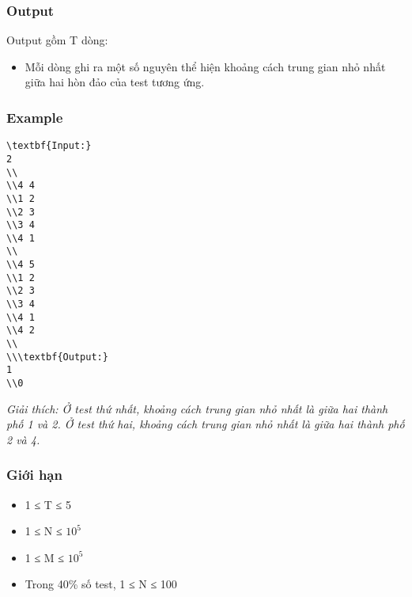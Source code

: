 \subsubsection{   Output  }

   Output gồm T dòng:  
\begin{itemize}
	\item     Mỗi dòng ghi ra một số nguyên thể hiện khoảng cách trung gian nhỏ nhất giữa hai hòn đảo của test tương ứng.   
\end{itemize}

\subsubsection{   Example  }
\begin{verbatim}
\textbf{Input:}
2
\\
\\4 4
\\1 2
\\2 3
\\3 4
\\4 1
\\
\\4 5 
\\1 2
\\2 3
\\3 4
\\4 1
\\4 2
\\
\\\textbf{Output:}
1
\\0\end{verbatim}

\emph{    Giải thích: Ở test thứ nhất, khoảng cách trung gian nhỏ nhất là giữa hai thành phố 1 và 2. Ở test thứ hai, khoảng cách trung gian nhỏ nhất là giữa hai thành phố 2 và 4.   }

\subsubsection{   Giới hạn  }
\begin{itemize}
	\item     1 ≤ T ≤ 5   
	\item     1 ≤ N ≤ $10^{5}$
	\item     1 ≤ M ≤ $10^{5}$
	\item     Trong 40\% số test, 1 ≤ N ≤ 100   
\end{itemize}
